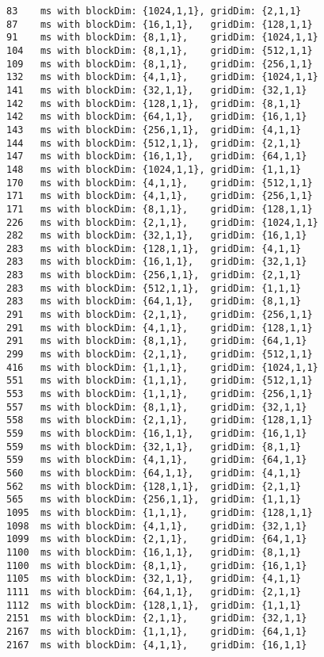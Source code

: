 \begin{lstlisting}
83    ms with blockDim: {1024,1,1}, gridDim: {2,1,1}
87    ms with blockDim: {16,1,1},   gridDim: {128,1,1}
91    ms with blockDim: {8,1,1},    gridDim: {1024,1,1}
104   ms with blockDim: {8,1,1},    gridDim: {512,1,1}
109   ms with blockDim: {8,1,1},    gridDim: {256,1,1}
132   ms with blockDim: {4,1,1},    gridDim: {1024,1,1}
141   ms with blockDim: {32,1,1},   gridDim: {32,1,1}
142   ms with blockDim: {128,1,1},  gridDim: {8,1,1}
142   ms with blockDim: {64,1,1},   gridDim: {16,1,1}
143   ms with blockDim: {256,1,1},  gridDim: {4,1,1}
144   ms with blockDim: {512,1,1},  gridDim: {2,1,1}
147   ms with blockDim: {16,1,1},   gridDim: {64,1,1}
148   ms with blockDim: {1024,1,1}, gridDim: {1,1,1}
170   ms with blockDim: {4,1,1},    gridDim: {512,1,1}
171   ms with blockDim: {4,1,1},    gridDim: {256,1,1}
171   ms with blockDim: {8,1,1},    gridDim: {128,1,1}
226   ms with blockDim: {2,1,1},    gridDim: {1024,1,1}
282   ms with blockDim: {32,1,1},   gridDim: {16,1,1}
283   ms with blockDim: {128,1,1},  gridDim: {4,1,1}
283   ms with blockDim: {16,1,1},   gridDim: {32,1,1}
283   ms with blockDim: {256,1,1},  gridDim: {2,1,1}
283   ms with blockDim: {512,1,1},  gridDim: {1,1,1}
283   ms with blockDim: {64,1,1},   gridDim: {8,1,1}
291   ms with blockDim: {2,1,1},    gridDim: {256,1,1}
291   ms with blockDim: {4,1,1},    gridDim: {128,1,1}
291   ms with blockDim: {8,1,1},    gridDim: {64,1,1}
299   ms with blockDim: {2,1,1},    gridDim: {512,1,1}
416   ms with blockDim: {1,1,1},    gridDim: {1024,1,1}
551   ms with blockDim: {1,1,1},    gridDim: {512,1,1}
553   ms with blockDim: {1,1,1},    gridDim: {256,1,1}
557   ms with blockDim: {8,1,1},    gridDim: {32,1,1}
558   ms with blockDim: {2,1,1},    gridDim: {128,1,1}
559   ms with blockDim: {16,1,1},   gridDim: {16,1,1}
559   ms with blockDim: {32,1,1},   gridDim: {8,1,1}
559   ms with blockDim: {4,1,1},    gridDim: {64,1,1}
560   ms with blockDim: {64,1,1},   gridDim: {4,1,1}
562   ms with blockDim: {128,1,1},  gridDim: {2,1,1}
565   ms with blockDim: {256,1,1},  gridDim: {1,1,1}
1095  ms with blockDim: {1,1,1},    gridDim: {128,1,1}
1098  ms with blockDim: {4,1,1},    gridDim: {32,1,1}
1099  ms with blockDim: {2,1,1},    gridDim: {64,1,1}
1100  ms with blockDim: {16,1,1},   gridDim: {8,1,1}
1100  ms with blockDim: {8,1,1},    gridDim: {16,1,1}
1105  ms with blockDim: {32,1,1},   gridDim: {4,1,1}
1111  ms with blockDim: {64,1,1},   gridDim: {2,1,1}
1112  ms with blockDim: {128,1,1},  gridDim: {1,1,1}
2151  ms with blockDim: {2,1,1},    gridDim: {32,1,1}
2167  ms with blockDim: {1,1,1},    gridDim: {64,1,1}
2167  ms with blockDim: {4,1,1},    gridDim: {16,1,1}

\end{lstlisting}
